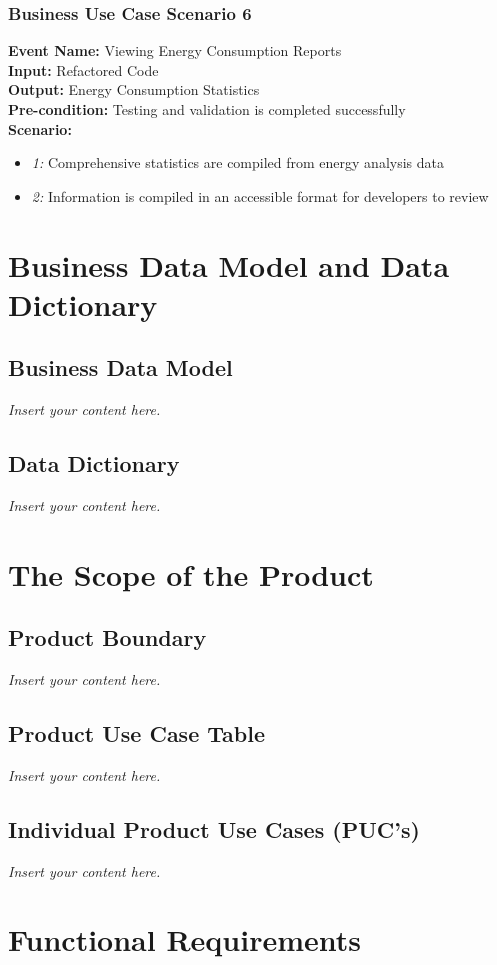 \documentclass[12pt]{article}
\newcommand{\lips}{\textit{Insert your content here.}}
\begin{document}
\subsubsection{Business Use Case Scenario 6} 
\textbf{Event Name:} Viewing Energy Consumption Reports \\
\textbf{Input:} Refactored Code \\
\textbf{Output:} Energy Consumption Statistics \\
\textbf{Pre-condition:} Testing and validation is completed successfully \\
\textbf{Scenario: } \\
\begin{itemize}
    \item \textit{1:} Comprehensive statistics are compiled from energy analysis data
    \item \textit{2:} Information is compiled in an accessible format for developers to review
\end{itemize}


\section{Business Data Model and Data Dictionary}
\subsection{Business Data Model}
\lips
\subsection{Data Dictionary}
\lips

\section{The Scope of the Product}
\subsection{Product Boundary}
\lips
\subsection{Product Use Case Table}
\lips
\subsection{Individual Product Use Cases (PUC's)}
\lips

\section{Functional Requirements}
\end{document}
